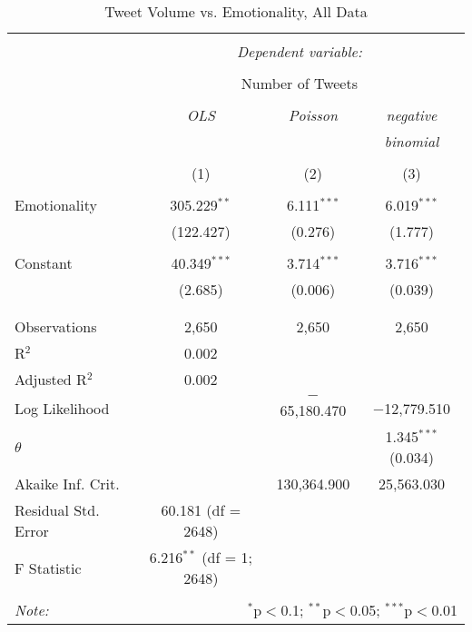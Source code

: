 \begin{table}[!htbp] \centering 
  \caption{Tweet Volume vs. Emotionality, All Data} 
  \label{} 
    \begin{tabular}{@{\extracolsep{5pt}}lccc} 
    \\[-1.8ex]\hline 
    \hline \\[-1.8ex] 
     & \multicolumn{3}{c}{\textit{Dependent variable:}} \\ 
    \cline{2-4} 
    \\[-1.8ex] & \multicolumn{3}{c}{Number of Tweets} \\ 
    \\[-1.8ex] & \textit{OLS} & \textit{Poisson} & \textit{negative} \\ 
     & \textit{} & \textit{} & \textit{binomial} \\ 
    \\[-1.8ex] & (1) & (2) & (3)\\ 
    \hline \\[-1.8ex] 
     Emotionality & 305.229$^{**}$ & 6.111$^{***}$ & 6.019$^{***}$ \\ 
      & (122.427) & (0.276) & (1.777) \\ 
      & & & \\ 
     Constant & 40.349$^{***}$ & 3.714$^{***}$ & 3.716$^{***}$ \\ 
      & (2.685) & (0.006) & (0.039) \\ 
      & & & \\ 
    \hline \\[-1.8ex] 
    Observations & 2,650 & 2,650 & 2,650 \\ 
    R$^{2}$ & 0.002 &  &  \\ 
    Adjusted R$^{2}$ & 0.002 &  &  \\ 
    Log Likelihood &  & $-$65,180.470 & $-$12,779.510 \\ 
    $\theta$ &  &  & 1.345$^{***}$  (0.034) \\ 
    Akaike Inf. Crit. &  & 130,364.900 & 25,563.030 \\ 
    Residual Std. Error & 60.181 (df = 2648) &  &  \\ 
    F Statistic & 6.216$^{**}$ (df = 1; 2648) &  &  \\ 
    \hline 
    \hline \\[-1.8ex] 
    \textit{Note:}  & \multicolumn{3}{r}{$^{*}$p$<$0.1; $^{**}$p$<$0.05; $^{***}$p$<$0.01} \\ 
    \end{tabular} 
\end{table} 
\newpage
 

